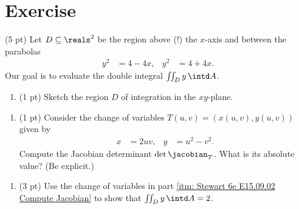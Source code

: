 %
%
\section{Exercise}

(5 pt) Let $D \subseteq \reals^{2}$ be the region above (!) the $x$-axis and between the parabolas
\begin{align*}
y^{2}
&=
4 - 4 x,
&
y^{2}
&=
4 + 4 x.
\end{align*}
Our goal is to evaluate the double integral $\iint_{D} y \, \intd A$.
\begin{enumerate}[label=(\alph*)]
\item (1 pt) Sketch the region $D$ of integration in the $x y$-plane.
\end{enumerate}

\spaceSolution{1in}{}



\begin{enumerate}[resume,label=(\alph*)]
\item\label{itm: Stewart 6e E15.09.02 Compute Jacobian} (1 pt) Consider the change of variables $T(u,v) = (x(u,v),y(u,v))$ given by
\begin{align*}
x
&=
2 u v,
&
y
&=
u^{2} - v^{2}.
\end{align*}
Compute the Jacobian determinant $\det \jacobian_{T}$. What is its absolute value? (Be explicit.)
\end{enumerate}

\spaceSolution{1.5in}{}



\begin{enumerate}[resume,label=(\alph*)]
\item (3 pt) Use the change of variables in part \ref{itm: Stewart 6e E15.09.02 Compute Jacobian} to show that $\iint_{D} y \, \intd A = 2$.
\end{enumerate}

\spaceSolution{4in}{}